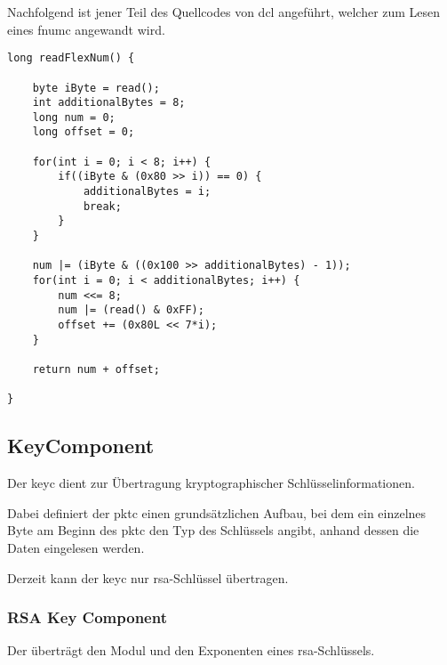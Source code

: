 Nachfolgend ist jener Teil des Quellcodes von \gls{dcl} angeführt, welcher zum Lesen eines
\gls{fnumc} angewandt wird.\\

\javalisting
\listingneedspace
\begin{lstlisting}[caption={Lesen eines \gls*{fnumc} (Java)},captionpos=b]
long readFlexNum() {

	byte iByte = read();
	int additionalBytes = 8;
	long num = 0;
	long offset = 0;

	for(int i = 0; i < 8; i++) {
		if((iByte & (0x80 >> i)) == 0) {
			additionalBytes = i;
			break;
		}
	}

	num |= (iByte & ((0x100 >> additionalBytes) - 1));
	for(int i = 0; i < additionalBytes; i++) {
		num <<= 8;
		num |= (read() & 0xFF);
		offset += (0x80L << 7*i);
	}

	return num + offset;

}
\end{lstlisting}


\subsection{KeyComponent}
\label{dcl-packetcomponents-key}

Der \gls{keyc} dient zur Übertragung kryptographischer Schlüsselinformationen.

Dabei definiert der \gls{pktc} einen grundsätzlichen Aufbau, bei dem ein
einzelnes Byte am Beginn des \gls{pktc} den Typ des Schlüssels angibt, anhand
dessen die Daten eingelesen werden.


Derzeit kann der \gls{keyc} nur \gls{rsa}-Schlüssel übertragen.

\subsubsection{RSA Key Component}
\label{dcl-keyc-rsa}
Der \comp{\keycrsa} überträgt den Modul und den Exponenten eines
\gls{rsa}-Schlüssels.

\keycrsabytefield
